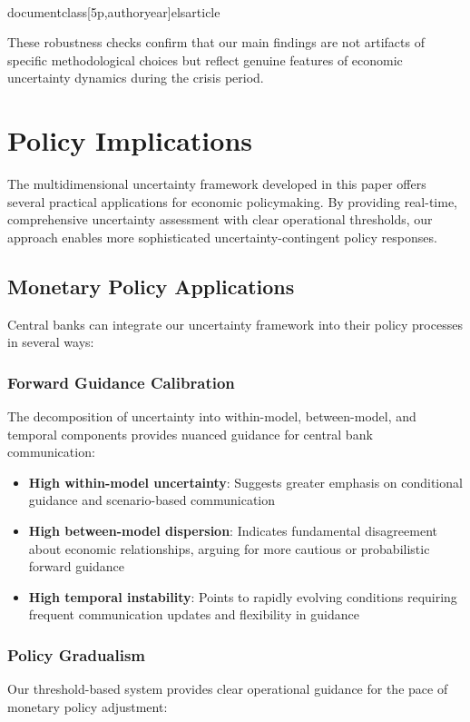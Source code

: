 \\documentclass[5p,authoryear]{elsarticle}
\begin{document}
{These robustness checks confirm that our main findings are not artifacts of specific methodological choices but reflect genuine features of economic uncertainty dynamics during the crisis period.

\section{Policy Implications}

The multidimensional uncertainty framework developed in this paper offers several practical applications for economic policymaking. By providing real-time, comprehensive uncertainty assessment with clear operational thresholds, our approach enables more sophisticated uncertainty-contingent policy responses.

\subsection{Monetary Policy Applications}

Central banks can integrate our uncertainty framework into their policy processes in several ways:

\subsubsection{Forward Guidance Calibration}
The decomposition of uncertainty into within-model, between-model, and temporal components provides nuanced guidance for central bank communication:

\begin{itemize}
    \item \textbf{High within-model uncertainty}: Suggests greater emphasis on conditional guidance and scenario-based communication
    \item \textbf{High between-model dispersion}: Indicates fundamental disagreement about economic relationships, arguing for more cautious or probabilistic forward guidance
    \item \textbf{High temporal instability}: Points to rapidly evolving conditions requiring frequent communication updates and flexibility in guidance
\end{itemize}

\subsubsection{Policy Gradualism}
Our threshold-based system provides clear operational guidance for the pace of monetary policy adjustment:

}
\end{document}
